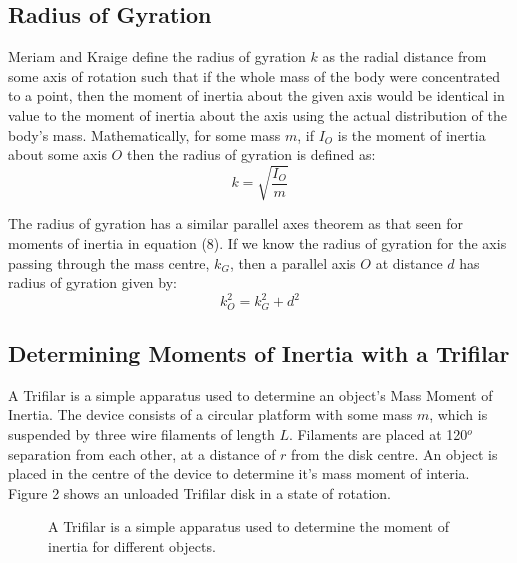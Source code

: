 \documentclass[a4paper]{article}
\begin{document}
\subsection{Radius of Gyration}
Meriam and Kraige define the radius of gyration $k$ as the radial distance from some axis of rotation such that if the whole mass of the body were concentrated to a point, then the moment of inertia about the given axis would be identical in value to the moment of inertia about the axis using the actual distribution of the body's mass. Mathematically, for some mass $m$, if $I_O$ is the moment of inertia about some axis $O$ then the radius of gyration is defined as:
\begin{equation}
k = \sqrt{\frac{I_O}{m}}
\end{equation}

The radius of gyration has a similar parallel axes theorem as that seen for moments of inertia in equation (8). If we know the radius of gyration for the axis passing through the mass centre, $k_G$, then a parallel axis $O$ at distance $d$ has radius of gyration given by:
\begin{equation}
	k^2_O = k^2_G + d^2
\end{equation}

\subsection{Determining Moments of Inertia with a Trifilar}
A Trifilar is a simple apparatus used to determine an object's Mass Moment of Inertia. The device consists of a circular platform with some mass $m$, which is suspended by three wire filaments of length $L$. Filaments are placed at 120$^o$ separation from each other, at a distance of $r$ from the disk centre. An object is placed in the centre of the device to determine it's mass moment of interia. Figure 2 shows an unloaded Trifilar disk in a state of rotation.

\begin{figure}[h]
	\centering
	\caption{A Trifilar is a simple apparatus used to determine the moment of inertia for different objects.}
\end{figure}
\end{document}
